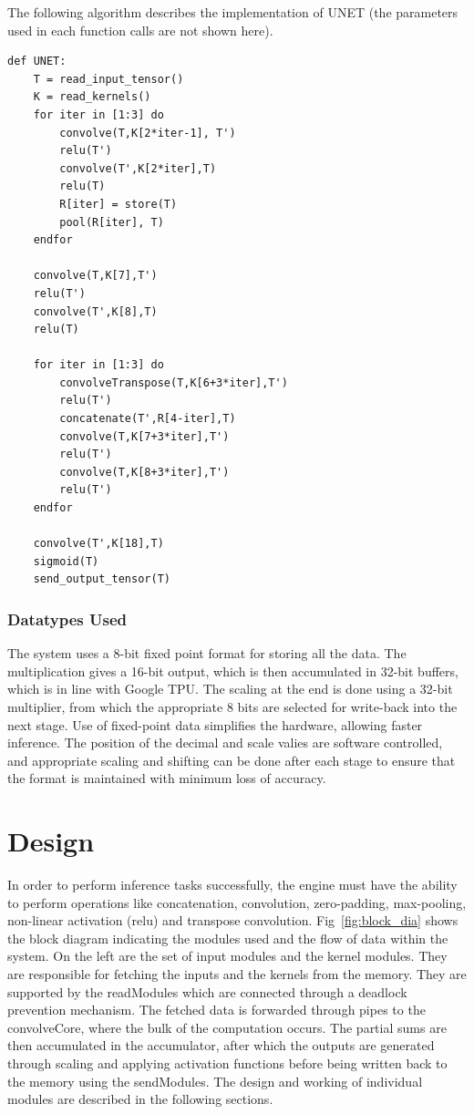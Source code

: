 \documentclass[a4paper,12pt, final]{report}
\begin{document}
The following algorithm describes the implementation of UNET (the parameters used in each function calls are not shown here).

\begin{Verbatim}
def UNET:
    T = read_input_tensor()
    K = read_kernels()
    for iter in [1:3] do
        convolve(T,K[2*iter-1], T')
        relu(T')
        convolve(T',K[2*iter],T)
        relu(T)
        R[iter] = store(T)
        pool(R[iter], T)
    endfor
    
    convolve(T,K[7],T')
    relu(T')
    convolve(T',K[8],T)
    relu(T)
    
    for iter in [1:3] do
        convolveTranspose(T,K[6+3*iter],T')
        relu(T')
        concatenate(T',R[4-iter],T)
        convolve(T,K[7+3*iter],T')
        relu(T')
        convolve(T,K[8+3*iter],T')
        relu(T')
    endfor

    convolve(T',K[18],T)
    sigmoid(T)
    send_output_tensor(T)
\end{Verbatim}

\subsection{Datatypes Used}

The system uses a 8-bit fixed point format for storing all the data. The multiplication gives a 16-bit output, which is then accumulated in 32-bit buffers, which is in line with Google TPU. The scaling at the end is done using a 32-bit multiplier, from which the appropriate 8 bits are selected for write-back into the next stage.  Use of fixed-point data simplifies the hardware, allowing faster inference. The position of the decimal and scale valies are software controlled, and appropriate scaling and shifting can be done after each stage to ensure that the format is maintained with minimum loss of accuracy.


\chapter{Design}\label{ch:3}

In order to perform inference tasks successfully, the engine must have the ability to perform operations like concatenation, convolution, zero-padding, max-pooling, non-linear activation (relu) and transpose convolution. Fig~\ref{fig:block_dia} shows the block diagram indicating the modules used and the flow of data within the system. On the left are the set of input modules and the kernel modules. They are responsible for fetching the inputs and the kernels from the memory. They are supported by the readModules which are connected through a deadlock prevention mechanism. The fetched data is forwarded through pipes to the convolveCore, where the bulk of the computation occurs. The partial sums are then accumulated in the accumulator, after which the outputs are generated through scaling and applying activation functions before being written back to the memory using the sendModules. The design and working of individual modules are described in the following sections.
\\
\end{document}
